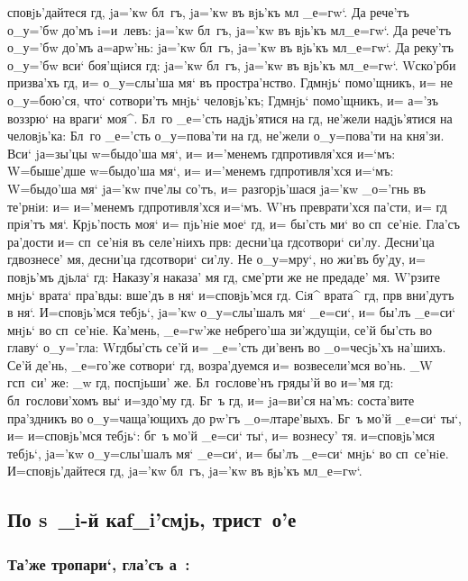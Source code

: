 \documentclass[12pt,a6paper,twoside,dvips,civil=antiqua,cs=izhitsa]{hipbook}
\begin{document}
сповjь'дайтеся гд, jа='кw бл~гъ, jа='кw въ вjь'къ мл
_е=гw`. Да рече'тъ о_у='бw до'мъ i=и~левъ: jа='кw бл~гъ, jа='кw въ вjь'къ
мл _е=гw`. Да рече'тъ о_у='бw до'мъ а=арw'нь: jа='кw бл~гъ, jа='кw въ
вjь'къ мл _е=гw`. Да реку'тъ о_у='бw вси` боя'щiися гд: jа='кw бл~гъ,
jа='кw въ вjь'къ мл _е=гw`. W\т ско'рби призва'хъ гд, и= о_у=слы'ша мя`
въ простра'нство. Гд мнjь` помо'щникъ, и= не о_у=бою'ся, что` сотвори'тъ
мнjь` человjь'къ; Гд мнjь` помо'щникъ, и= а='зъ воззрю` на враги`
моя^. Бл~го _е='сть надjь'ятися на гд, не'жели надjь'ятися на человjь'ка:
Бл~го _е='сть о_у=пова'ти на гд, не'жели о_у=пова'ти на кня'зи. Вси`
jа=зы'цы w=быдо'ша мя`, и= и='менемъ гд противля'хся и=`мъ: W=быше'дше
w=быдо'ша мя`, и= и='менемъ гд противля'хся и=`мъ: W=быдо'ша мя` jа='кw
пче'лы со'тъ, и= разгорjь'шася jа='кw _о='гнь въ те'рнiи: и= и='менемъ
гд противля'хся и=`мъ. W'нъ преврати'хся па'сти, и= гд
прiя'тъ мя`. Крjь'пость моя` и= пjь'нiе мое` гд, и= бы'сть ми` во
сп~се'нiе. Гла'съ ра'дости и= сп~се'нiя въ селе'нiихъ прв: десни'ца
гд сотвори` си'лу. Десни'ца гд вознесе' мя, десни'ца гд сотвори`
си'лу. Не о_у=мру`, но жи'въ бу'ду, и= повjь'мъ дjьла` гд: Наказу'я
наказа' мя гд, сме'рти же не предаде' мя. W'рзите мнjь` врата`
пра'вды: вше'дъ в ня` и=сповjь'мся гд. Сiя^ врата^ гд, прв
вни'дутъ в ня`. И=сповjь'мся тебjь`, jа='кw о_у=слы'шалъ мя` _е=си`, и= бы'лъ
_е=си` мнjь` во сп~се'нiе. Ка'мень, _е=гw'же небрего'ша зи'ждущiи, се'й
бы'сть во главу` о_у='гла: W\т гд бы'сть се'й и= _е='сть ди'венъ во
_о=чесjь'хъ на'шихъ. Се'й де'нь, _е=го'же сотвори` гд, возра'дуемся и=
возвесели'мся во'нь. _W г сп~си' же: _w гд, поспjьши' же. Бл~гослове'нъ
гряды'й во и='мя гд: бл~гослови'хомъ вы` и=з\ъ до'му гд. Бг~ъ гд,
и= jа=ви'ся на'мъ: соста'вите пра'здникъ во о_у=чаща'ющихъ до рw'гъ
_о=лтаре'выхъ. Бг~ъ мо'й _е=си` ты`, и= и=сповjь'мся тебjь`: бг~ъ мо'й _е=си`
ты`, и= вознесу' тя. и=сповjь'мся тебjь`, jа='кw о_у=слы'шалъ мя` _е=си`, и=
бы'лъ _е=си` мнjь` во сп~се'нiе. И=сповjь'дайтеся гд, jа='кw бл~гъ,
jа='кw въ вjь'къ мл _е=гw`.

\slava

\delimpict

\subsection{По s~_i-й каf_i'смjь, трист~о'е}

\subsubsection{Та'же тропари`, гла'съ а~:}
\end{document}
